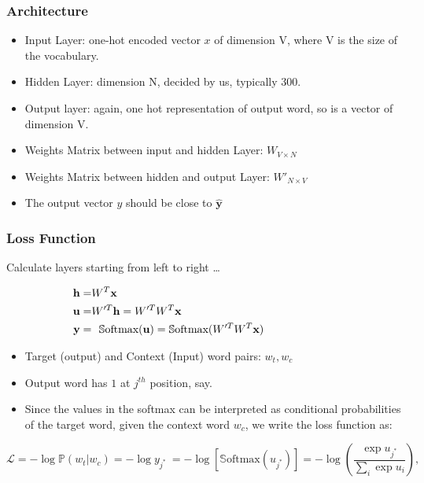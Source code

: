 \begin{frame}[fragile]\frametitle{Architecture}
  \begin{itemize}
    \item Input Layer:  one-hot encoded vector $x$ of dimension V, where V is the size of the vocabulary.
	\item Hidden Layer: dimension N, decided by us, typically 300.
	\item Output layer: again, one hot representation of output word, so is a vector of dimension V.
    \item Weights Matrix between input and hidden Layer: $W_{V \times N}$
    \item Weights Matrix between hidden and output Layer: $W'_{N \times V}$	
	\item The output vector $y$ should be close to $\hat{\textbf{y}}$
  \end{itemize}
  

\end{frame}

\begin{frame}[fragile]\frametitle{Loss Function}
Calculate layers starting from left to right \ldots

\begin{eqnarray*}
\textbf{h} = & W^T\textbf{x} \hspace{7.0cm}  \\
\textbf{u}= & W'^T\textbf{h}=W'^TW^T\textbf{x} \hspace{4.6cm}  \\
\textbf{y}= & \ \ \mathbb{S}\textrm{oftmax}(\textbf{u})= \mathbb{S}\textrm{oftmax}(W'^TW^T\textbf{x})  \hspace{2cm}
\end{eqnarray*}

  \begin{itemize}
    \item Target (output) and Context (Input) word pairs: $w_t, w_c$
	\item Output word has $1$ at $j^{th}$ position, say.
	\item  Since the values in the softmax can be interpreted as conditional probabilities of the target word, given the context word 
$w_c$, we write the loss function as:
  \end{itemize}
  
\begin{equation*}
\mathcal{L} = -\log \mathbb{P}(w_t|w_c)=-\log y_{j^*}\ =-\log[\mathbb{S}\textrm{oftmax}(u_{j^*})]=-\log\left(\frac{\exp{u_{j^*}}}{\sum_i \exp{u_i}}\right),
\end{equation*}
\end{frame}

